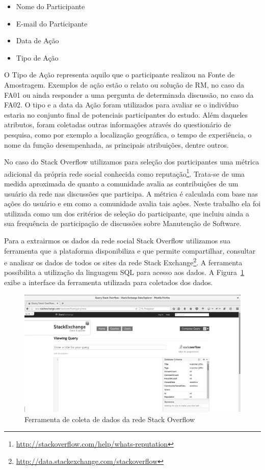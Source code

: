 \begin{itemize}
	\item Nome do Participante
	\item E-mail do Participante
	\item Data de Ação
	\item Tipo de Ação
\end{itemize}

O Tipo de Ação representa aquilo que o participante realizou na Fonte de
Amostragem. Exemplos de ação estão o relato ou solução de RM, no caso da FA01 ou
ainda responder a uma pergunta de determinada discussão, no caso da FA02. O tipo
e a data da Ação foram utilizados para avaliar se o indivíduo estaria no
conjunto final de potenciais participantes do estudo. Além daqueles atributos,
foram coletadas outras informações através do questionário de pesquisa, como por
exemplo a localização geográfica, o tempo de experiência, o nome da função
desempenhada, as principais atribuições, dentre outros.

No caso do Stack Overflow utilizamos para seleção dos participantes uma métrica
adicional da própria rede social conhecida como
reputação\footnote{\url{http://stackoverflow.com/help/whats-reputation}}.
Trata-se de uma medida aproximada de quanto a comunidade avalia as contribuições
de um usuário da rede nas discussões que participa. A métrica é calculada com
base nas ações do usuário e em como a comunidade avalia tais ações. Neste
trabalho ela foi utilizada como um dos critérios de seleção do participante, que
incluiu ainda a sua frequência de participação de discussões sobre Manutenção de
Software.

Para a extrairmos os dados da rede social Stack Overflow utilizamos sua
ferramenta que a plataforma disponibiliza e que permite compartilhar, consultar
e analisar os dados de todos os sites da rede Stack
Exchange\footnote{\url{http://data.stackexchange.com/stackoverflow}}. A
ferramenta possibilita a utilização da linguagem SQL para acesso aos dados. A
Figura~\ref{fig:stack-exchange} exibe a interface da ferramenta utilizada para
coletados dos dados.

\begin{figure}[htpb]
	\centering
	\includegraphics[width=0.6\linewidth]{./chapter-pesquisa-com-profissionais/img/stack-exchange.png}
	\caption{Ferramenta de coleta de dados da rede Stack Overflow}
\label{fig:stack-exchange}
\end{figure}

